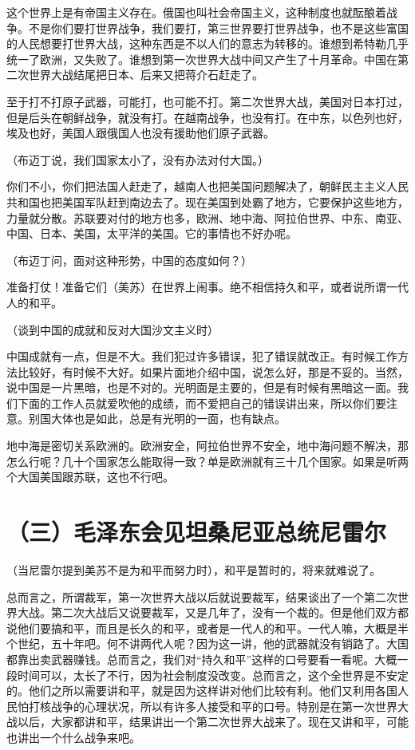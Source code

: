 这个世界上是有帝国主义存在。俄国也叫社会帝国主义，这种制度也就酝酿着战争。不是你们要打世界战争，我们要打，第三世界要打世界战争，也不是这些富国的人民想要打世界大战，这种东西是不以人们的意志为转移的。谁想到希特勒几乎统一了欧洲，又失败了。谁想到第一次世界大战中间又产生了十月革命。中国在第二次世界大战结尾把日本、后来又把蒋介石赶走了。

至于打不打原子武器，可能打，也可能不打。第二次世界大战，美国对日本打过，但是后头在朝鲜战争，就没有打。在越南战争，也没有打。在中东，以色列也好，埃及也好，美国人跟俄国人也没有援助他们原子武器。

（布迈丁说，我们国家太小了，没有办法对付大国。）

你们不小，你们把法国人赶走了，越南人也把美国问题解决了，朝鲜民主主义人民共和国也把美国军队赶到南边去了。现在美国到处霸了地方，它要保护这些地方，力量就分散。苏联要对付的地方也多，欧洲、地中海、阿拉伯世界、中东、南亚、中国、日本、美国，太平洋的美国。它的事情也不好办呢。

（布迈丁问，面对这种形势，中国的态度如何？）

准备打仗！准备它们（美苏）在世界上闹事。绝不相信持久和平，或者说所谓一代人的和平。

（谈到中国的成就和反对大国沙文主义时）

中国成就有一点，但是不大。我们犯过许多错误，犯了错误就改正。有时候工作方法比较好，有时候不大好。如果片面地介绍中国，说怎么好，那是不妥的。当然，说中国是一片黑暗，也是不对的。光明面是主要的，但是有时候有黑暗这一面。我们下面的工作人员就爱吹他的成绩，而不爱把自己的错误讲出来，所以你们要注意。别国大体也是如此，总是有光明的一面，也有缺点。

地中海是密切关系欧洲的。欧洲安全，阿拉伯世界不安全，地中海问题不解决，那怎么行呢？几十个国家怎么能取得一致？单是欧洲就有三十几个国家。如果是听两个大国美国跟苏联，这也不行吧。

\date{一九七四年三月二十五日}
\section{（三）毛泽东会见坦桑尼亚总统尼雷尔}

（当尼雷尔提到美苏不是为和平而努力时），和平是暂时的，将来就难说了。

总而言之，所谓裁军，第一次世界大战以后就说要裁军，结果谈出了一个第二次世界大战。第二次大战后又说要裁军，又是几年了，没有一个裁的。但是他们双方都说他们要搞和平，而且是长久的和平，或者是一代人的和平。一代人嘛，大概是半个世纪，五十年吧。何不讲两代人呢？因为这一讲，他的武器就没有销路了。大国都靠出卖武器赚钱。总而言之，我们对“持久和平”这样的口号要看一看呢。大概一段时间可以，太长了不行，因为社会制度没改变。总而言之，这个全世界是不安定的。他们之所以需要讲和平，就是因为这样讲对他们比较有利。他们又利用各国人民怕打核战争的心理状况，所以有许多人接受和平的口号。特别是在第一次世界大战以后，大家都讲和平，结果讲出一个第二次世界大战来了。现在又讲和平，可能也讲出一个什么战争来吧。

